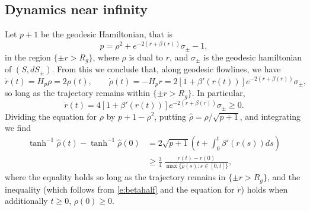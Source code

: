 \documentclass[reqno, 12pt]{amsart}
\theoremstyle{definition}
\numberwithin{equation}{section}
\numberwithin{prop}{section}
\numberwithin{figure}{section}
\begin{document}
\subsection{Dynamics near infinity}
Let $p+1$ be the geodesic Hamiltonian, that is
\[
p = \rho^2 + e^{-2(r + \beta(r))}\sigma_\pm - 1,
\]
in the region $\{\pm r > R_g\}$, where $\rho$ is dual to $r$, and $\sigma_\pm$ is the geodesic hamiltonian of $(S,dS_\pm)$. From this we conclude that, along geodesic flowlines, we have
\[
\dot r(t) = H_p\rho = 2\rho(t), \qquad
\dot\rho(t) = -H_p r = 2 \left[1 + \beta'(r(t))\right] e^{-2(r + \beta(r))}\sigma_\pm,
\]
so long as the trajectory remains within $\{\pm r > R_g\}$. In particular,
\begin{equation}\label{e:convexity}
\ddot r(t) = 4\left[1 + \beta'(r(t))\right] e^{-2(r + \beta(r))} \sigma_\pm \ge 0.
\end{equation}
Dividing the equation for $\dot \rho$ by $p + 1 - \rho^2$, putting $\hat \rho = \rho/\sqrt{p+1}$, and integrating we find
\begin{equation}\label{tanh}\begin{split}
\tanh^{-1} \hat\rho(t) -  \tanh^{-1}\hat \rho(0) &= 2 \sqrt {p+1} \left(t + \int_0^t\beta'(r(s))ds\right)\\
& \ge \frac 34\ \frac{r(t) - r(0)}{\max\{\hat \rho(s): s \in [0,t]\}} ,
\end{split}\end{equation}
where the equality holds so long as the trajectory remains in $\{\pm r > R_g\}$, and the inequality (which follows from \eqref{e:betahalf} and the equation for $\dot r $) holds when additionally $t \ge 0$, $\rho(0) \ge 0$.
\end{document}
